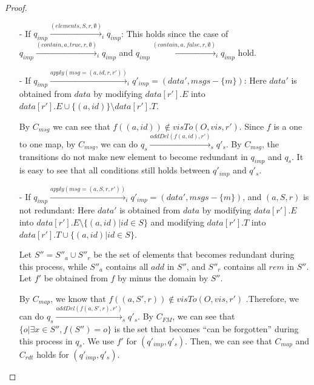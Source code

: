 \begin {proof}
\begin{itemize}
\item[-] If $q_{\mathit{imp}} \xrightarrow{( \mathit{elements},S,r,\emptyset )}_i q_{\mathit{imp}}$: This holds since the case of $q_{\mathit{imp}} \xrightarrow{( \mathit{contain},a,\mathit{true},r,\emptyset )}_i q_{\mathit{imp}}$ and $q_{\mathit{imp}} \xrightarrow{( \mathit{contain},a,\mathit{false},r,\emptyset )}_i q_{\mathit{imp}}$ hold.

\item[-] If $q_{\mathit{imp}} \xrightarrow{\mathit{apply}( \mathit{msg}=(a,\mathit{id},r,r') )}_i q'_{\mathit{imp}} = (\mathit{data}',\mathit{msgs} - \{ m \})$: Here $\mathit{data}'$ is obtained from $\mathit{data}$ by modifying $\mathit{data}[r'].E$ into $\mathit{data}[r'].E \cup \{ (a,\mathit{id}) \} \setminus \mathit{data}[r'].T$.

    By $C_{\mathit{msg}}$ we can see that $f((a,\mathit{id})) \notin \mathit{visTo}(O,\mathit{vis},r')$. Since $f$ is a one to one map, by $C_{\mathit{msg}}$, we can do $q_s \xrightarrow{\mathit{addDel}( f(a,\mathit{id}),r' )}_s q'_s$. By $C_{\mathit{msg}}$, the transitions do not make new element to become redundant in $q_{\mathit{imp}}$ and $q_s$. It is easy to see that all conditions still holds between $q'_{\mathit{imp}}$ and $q'_s$.

\item[-] If $q_{\mathit{imp}} \xrightarrow{\mathit{apply}( \mathit{msg}=(a,S,r,r' ))}_i q'_{\mathit{imp}} = (\mathit{data}',\mathit{msgs} - \{ m \})$, and $(a,S,r)$ is not redundant: Here $\mathit{data}'$ is obtained from $\mathit{data}$ by modifying $\mathit{data}[r'].E$ into $\mathit{data}[r'].E \setminus \{ (a,\mathit{id}) \vert \mathit{id} \in S\}$ and modifying $\mathit{data}[r'].T$ into $\mathit{data}[r'].T \cup \{ (a,\mathit{id}) \vert \mathit{id} \in S\}$.

    Let $S'' = S''_a \cup S''_r$ be the set of elements that becomes redundant during this process, while $S''_a$ contains all $\mathit{add}$ in $S''$, and $S''_r$ contains all $\mathit{rem}$ in $S''$. Let $f'$ be obtained from $f$ by minus the domain by $S''$.

    By $C_{\mathit{map}}$, we know that $f((a,S',r)) \notin \mathit{visTo}(O,\mathit{vis},r')$ .Therefore, we can do $q_s \xrightarrow{\mathit{addDel}( f(a,S',r),r' )}_s q'_s$. By $C_{\mathit{FM}}$, we can see that $\{ o \vert \exists x \in S'', f(S'') = o \}$ is the set that becomes ``can be forgotten'' during this process in $q_s$. We use $f'$ for $(q'_{\mathit{imp}},q'_s)$. Then, we can see that $C_{\mathit{map}}$ and $C_{\mathit{rdt}}$ holds for $(q'_{\mathit{imp}},q'_s)$.


\end{itemize}
\end{proof}
